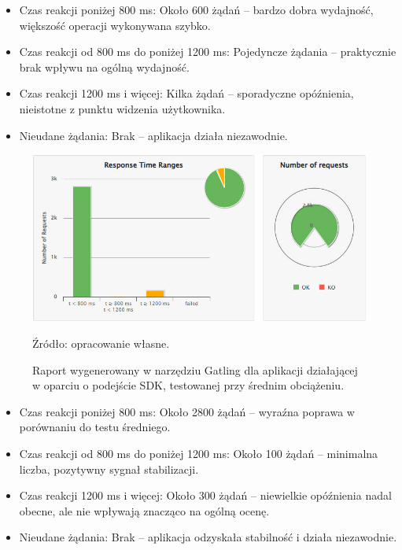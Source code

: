 \documentclass[runningheads,12pt]{llncs}
\begin{document}
\begin{itemize}
    \item Czas reakcji poniżej 800 ms: Około 600 żądań – bardzo dobra wydajność, większość operacji wykonywana szybko.
    \item Czas reakcji od 800 ms do poniżej 1200 ms: Pojedyncze żądania – praktycznie brak wpływu na ogólną wydajność.
    \item Czas reakcji 1200 ms i więcej: Kilka żądań – sporadyczne opóźnienia, nieistotne z punktu widzenia użytkownika.
    \item Nieudane żądania: Brak – aplikacja działa niezawodnie.
\end{itemize}

\newpage

\begin{figure}
    \centering
    \includegraphics[width=0.8\linewidth]{images/sdk-gatling-middle-graph.jpg}
    \caption{Raport wygenerowany w narzędziu Gatling dla aplikacji działającej w oparciu o podejście SDK, testowanej przy średnim obciążeniu.}
    \label{fig:middle}
    \vspace{0.5em}
    {\small Źródło: opracowanie własne.}
\end{figure}

\begin{itemize}
    \item Czas reakcji poniżej 800 ms: Około 2800 żądań – wyraźna poprawa w porównaniu do testu średniego.
    \item Czas reakcji od 800 ms do poniżej 1200 ms: Około 100 żądań – minimalna liczba, pozytywny sygnał stabilizacji.
    \item Czas reakcji 1200 ms i więcej: Około 300 żądań – niewielkie opóźnienia nadal obecne, ale nie wpływają znacząco na ogólną ocenę.
    \item Nieudane żądania: Brak – aplikacja odzyskała stabilność i działa niezawodnie.
\end{itemize}

\newpage
\end{document}
